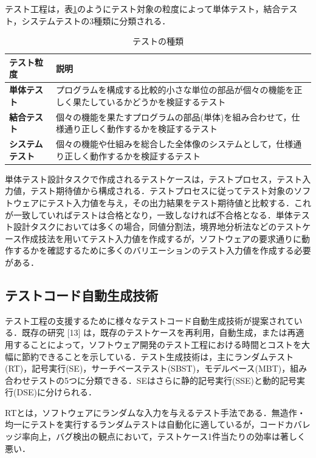 \documentclass[12pt]{jarticle} %
\begin{document}
テスト工程は，表\ref{test-variety}のようにテスト対象の粒度によって単体テスト，結合テスト，システムテストの3種類に分類される．

\begin{table}[t]
\caption{テストの種類}
\label{test-variety}
\begin{tabular}{|l|p{11cm}|}
\hline
\textbf{テスト粒度}                   & \textbf{説明}                                                                                                       \\ \hline
\textbf{単体テスト}        & プログラムを構成する比較的小さな単位の部品が個々の機能を正しく果たしているかどうかを検証するテスト \\ \hline
\textbf{結合テスト} & 個々の機能を果たすプログラムの部品(単体)を組み合わせて，仕様通り正しく動作するかを検証するテスト\\ \hline
\textbf{システムテスト}            & 個々の機能や仕組みを総合した全体像のシステムとして，仕様通り正しく動作するかを検証するテスト \\ \hline
\end{tabular}
\end{table}

単体テスト設計タスクで作成されるテストケースは，テストプロセス，テスト入力値，テスト期待値から構成される．テストプロセスに従ってテスト対象のソフトウェアにテスト入力値を与え，その出力結果をテスト期待値と比較する．これが一致していればテストは合格となり，一致しなければ不合格となる．単体テスト設計タスクにおいては多くの場合，同値分割法，境界地分析法などのテストケース作成技法を用いてテスト入力値を作成するが，ソフトウェアの要求通りに動作するかを確認するために多くのバリエーションのテスト入力値を作成する必要がある．


\subsection{テストコード自動生成技術}
テスト工程の支援するために様々なテストコード自動生成技術が提案されている．既存の研究 [13] は，既存のテストケースを再利用，自動生成，または再適用することによって，ソフトウェア開発のテスト工程における時間とコストを大幅に節約できることを示している．テスト生成技術は，主にランダムテスト(RT)，記号実行(SE)，サーチベーステスト(SBST)，モデルベース(MBT)，組み合わせテストの5つに分類できる．SEはさらに静的記号実行(SSE)と動的記号実行(DSE)に分けられる．

RTとは，ソフトウェアにランダムな入力を与えるテスト手法である．無造作・均一にテストを実行するランダムテストは自動化に適しているが，コードカバレッジ率向上，バグ検出の観点において，テストケース1件当たりの効率は著しく悪い．
\end{document}

